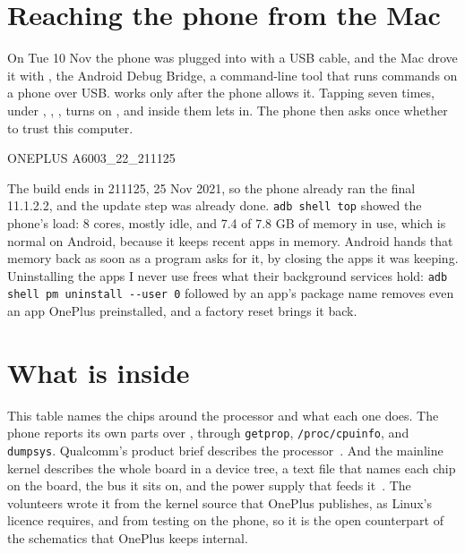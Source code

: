 \documentclass[11pt,a4paper]{article}
\begin{document}
\section*{Reaching the phone from the Mac}

On Tue 10 Nov the phone was plugged into  with a USB cable, and the Mac drove it with , the Android Debug Bridge, a command-line tool that runs commands on a phone over USB.  works only after the phone allows it. Tapping  seven times, under , , , turns on , and  inside them lets  in. The phone then asks once whether to trust this computer.

\begin{cmdout}
ONEPLUS A6003_22_211125
\end{cmdout}

The build ends in 211125, 25 Nov 2021, so the phone already ran the final  11.1.2.2, and the update step was already done. \texttt{adb shell top} showed the phone's load: 8 cores, mostly idle, and 7.4 of 7.8 GB of memory in use, which is normal on Android, because it keeps recent apps in memory. Android hands that memory back as soon as a program asks for it, by closing the apps it was keeping. Uninstalling the apps I never use frees what their background services hold: \texttt{adb shell pm uninstall -{}-user 0} followed by an app's package name removes even an app OnePlus preinstalled, and a factory reset brings it back.

\section*{What is inside}

This table names the chips around the processor and what each one does. The phone reports its own parts over , through \texttt{getprop}, \texttt{/proc/cpuinfo}, and \texttt{dumpsys}. Qualcomm's product brief describes the processor~\cite{qcom}. And the mainline kernel describes the whole board in a device tree, a text file that names each chip on the board, the bus it sits on, and the power supply that feeds it~\cite{dts}. The  volunteers wrote it from the kernel source that OnePlus publishes, as Linux's licence requires, and from testing on the phone, so it is the open counterpart of the schematics that OnePlus keeps internal.
\end{document}
